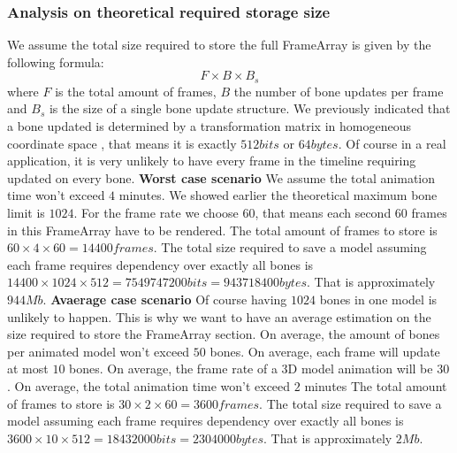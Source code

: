 \subsubsection{Analysis on theoretical required storage size}
We assume the total size required to store the full FrameArray is given by the following formula:
\begin{equation}
    F \times B \times B_s
\end{equation}
where $F$ is the total amount of frames, $B$ the number of bone updates per frame and $B_s$ is the size of a single bone update structure.\newline
We previously indicated that a bone updated is determined by a transformation matrix in homogeneous coordinate space \cite{HomogeneousCoordinates}, that means it is exactly $512bits$ or $64bytes$.\newline
Of course in a real application, it is very unlikely to have every frame in the timeline requiring updated on every bone.\newline
\newline\textbf{Worst case scenario}\newline
We assume the total animation time won't exceed $4$ minutes.
We showed earlier the theoretical maximum bone limit is $1024$.\newline
For the frame rate we choose $60$, that means each second $60$ frames in this FrameArray have to be rendered.\newline
The total amount of frames to store is $60 \times 4 \times 60 = 14400frames$.\newline
The total size required to save a model assuming each frame requires dependency over exactly all bones is $14400 \times 1024 \times 512 = 7549747200bits = 943718400bytes$. That is approximately $944Mb$.\newline
\newline\textbf{Avaerage case scenario}\newline
Of course having $1024$ bones in one model is unlikely to happen. This is why we want to have an average estimation on the size required to store the FrameArray section.\newline
On average, the amount of bones per animated model won't exceed $50$ bones.\newline
On average, each frame will update at most $10$ bones.\newline
On average, the frame rate of a 3D model animation will be $30$.\newline
On average, the total animation time won't exceed $2$ minutes
The total amount of frames to store is $30 \times 2 \times 60 = 3600frames$.\newline
The total size required to save a model assuming each frame requires dependency over exactly all bones is $3600 \times 10 \times 512 = 18432000bits = 2304000bytes$. That is approximately $2Mb$.